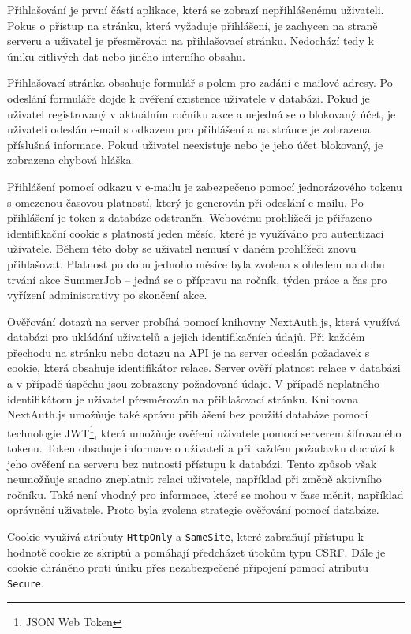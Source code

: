 Přihlašování je první částí aplikace, která se zobrazí nepřihlášenému uživateli. Pokus o přístup na stránku, která vyžaduje přihlášení,
je zachycen na straně serveru a uživatel je přesměrován na přihlašovací stránku. Nedochází tedy k úniku citlivých dat nebo jiného interního obsahu.

Přihlašovací stránka obsahuje formulář s polem pro zadání e-mailové adresy. Po odeslání formuláře dojde k ověření existence uživatele v databázi.
Pokud je uživatel registrovaný v aktuálním ročníku akce a nejedná se o blokovaný účet, je uživateli odeslán e-mail s odkazem pro přihlášení a na stránce je 
zobrazena příslušná informace. Pokud uživatel neexistuje nebo je jeho účet blokovaný, je zobrazena chybová hláška.

Přihlášení pomocí odkazu v e-mailu je zabezpečeno pomocí jednorázového tokenu s omezenou časovou platností, který je generován při odeslání e-mailu.
Po přihlášení je token z databáze odstraněn.
Webovému prohlížeči je přiřazeno identifikační cookie s platností jeden měsíc, které je využíváno pro autentizaci uživatele. Během této doby se uživatel nemusí v
daném prohlížeči znovu přihlašovat. Platnost po dobu jednoho měsíce byla zvolena s ohledem na dobu trvání akce SummerJob -- jedná se o přípravu na ročník,
týden práce a čas pro vyřízení administrativy po skončení akce.

Ověřování dotazů na server probíhá pomocí knihovny NextAuth.js, která využívá databázi pro ukládání uživatelů a jejich identifikačních údajů. Při každém přechodu na stránku
nebo dotazu na API je na server odeslán požadavek s cookie, která obsahuje identifikátor relace. Server ověří platnost relace v databázi a v případě úspěchu jsou zobrazeny
požadované údaje. V případě neplatného identifikátoru je uživatel přesměrován na přihlašovací stránku. Knihovna NextAuth.js umožňuje také správu přihlášení bez použití databáze pomocí
technologie JWT\footnote{JSON Web Token}, která umožňuje ověření uživatele pomocí serverem šifrovaného tokenu. Token obsahuje informace o uživateli 
a při každém požadavku dochází k jeho ověření na serveru bez nutnosti přístupu k databázi. Tento způsob však neumožňuje snadno zneplatnit relaci uživatele, například při změně aktivního ročníku.
Také není vhodný pro informace, které se mohou v čase měnit, například oprávnění uživatele. Proto byla zvolena strategie ověřování pomocí databáze.

Cookie využívá atributy \texttt{HttpOnly} a \texttt{SameSite}, které zabraňují přístupu k hodnotě cookie ze skriptů a
pomáhají předcházet útokům typu CSRF. Dále je cookie chráněno proti úniku přes nezabezpečené připojení pomocí atributu \texttt{Secure}. 

